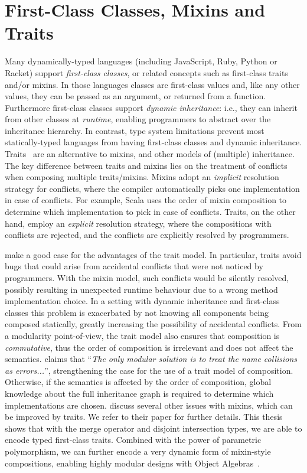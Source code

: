 \section{First-Class Classes, Mixins and Traits}

Many dynamically-typed languages (including JavaScript, Ruby, Python or Racket)
support \emph{first-class classes}, or related concepts such as first-class
traits and/or mixins. In those languages classes are first-class values and,
like any other values, they can be passed as an argument, or returned from a
function. Furthermore first-class classes support \emph{dynamic inheritance}:
i.e., they can inherit from other classes at \emph{runtime}, enabling programmers
to abstract over the inheritance hierarchy. In contrast, type system limitations
prevent most statically-typed languages from having first-class classes and
dynamic inheritance. Traits~\citep{scharli2003traits, Ducasse_2006} are an alternative to
mixins, and other models of (multiple) inheritance. The key difference between
traits and mixins lies on the treatment of conflicts when composing multiple
traits/mixins. Mixins adopt an \emph{implicit} resolution strategy for
conflicts, where the compiler automatically picks one implementation in case of
conflicts. For example, Scala uses the order of mixin composition to determine
which implementation to pick in case of conflicts. Traits, on the other hand,
employ an \emph{explicit} resolution strategy, where the compositions with
conflicts are rejected, and the conflicts are explicitly resolved by
programmers.

\citet{scharli2003traits} make a good case for the advantages of the trait
model. In particular, traits avoid bugs that could arise from accidental
conflicts that were not noticed by programmers. With the mixin model, such
conflicts would be silently resolved, possibly resulting in unexpected runtime
behaviour due to a wrong method implementation choice. In a setting with dynamic
inheritance and first-class classes this problem is exacerbated by not knowing
all components being composed statically, greatly increasing the possibility of
accidental conflicts. From a modularity point-of-view, the trait model also
ensures that composition is \emph{commutative}, thus the order of composition is
irrelevant and does not affect the semantics. \citet{bracha1992programming}
claims that ``\emph{The only modular solution is to treat the name collisions as
  errors...}'', strengthening the case for the use of a trait model of
composition. Otherwise, if the semantics is affected by the order of
composition, global knowledge about the full inheritance graph is required to
determine which implementations are chosen. \citet{scharli2003traits} discuss
several other issues with mixins, which can be improved by traits. We refer to
their paper for further details. This thesis shows that with the merge operator
and disjoint intersection types, we are able to encode typed first-class traits.
Combined with the power of parametric polymorphism, we can further encode a very
dynamic form of mixin-style compositions, enabling highly modular designs with
Object Algebras~\citep{oliveira2012extensibility}.


